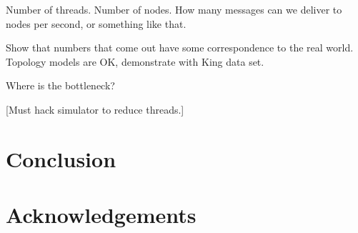 \documentclass[letterpaper,twocolumn,10pt]{article}
\begin{document}
Number of threads.  Number of nodes.  How many messages can we deliver to
nodes per second, or something like that.

Show that numbers that come out have some correspondence to the real world.
Topology models are OK, demonstrate with King data set.

Where is the bottleneck?

[Must hack simulator to reduce threads.]


\section{Conclusion}
\label{Section:Conclusion}

\section{Acknowledgements}
\label{Section:Acknowledgements}

\vfill

\pagebreak

\end{document}
